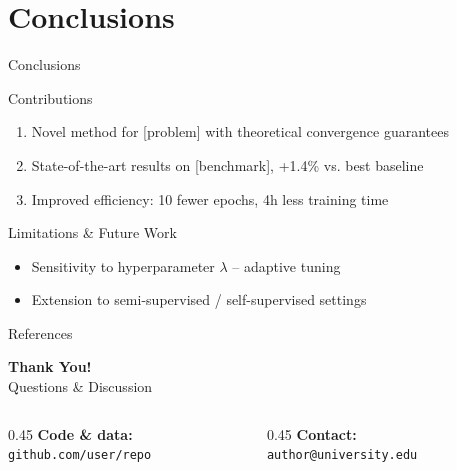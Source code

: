 \documentclass[aspectratio=169,11pt]{beamer}
\begin{document}
\section{Conclusions}

\begin{frame}{Conclusions}
  \begin{block}{Contributions}
    \begin{enumerate}
      \item Novel method for [problem] with theoretical convergence guarantees
      \item State-of-the-art results on [benchmark], +1.4\% vs. best baseline
      \item Improved efficiency: 10 fewer epochs, 4h less training time
    \end{enumerate}
  \end{block}
  \vfill
  \begin{alertblock}{Limitations \& Future Work}
    \begin{itemize}
      \item Sensitivity to hyperparameter $\lambda$ -- adaptive tuning
      \item Extension to semi-supervised / self-supervised settings
    \end{itemize}
  \end{alertblock}
\end{frame}

\begin{frame}[allowframebreaks]{References}
  
  
\end{frame}

\begin{frame}
  \centering
  \vspace{1cm}
  {\Huge\bfseries\color{mlblue} Thank You!}\\[1em]
  {\large Questions \& Discussion}\\[2em]
  \begin{columns}[c]
    \begin{column}{0.45\textwidth}
      \centering
      \small
      \textbf{Code \& data:}\\
      \texttt{github.com/user/repo}
    \end{column}
    \begin{column}{0.45\textwidth}
      \centering
      \small
      \textbf{Contact:}\\
      \texttt{author@university.edu}
    \end{column}
  \end{columns}
\end{frame}
\end{document}
